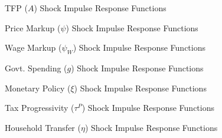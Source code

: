 \begin{figure}[ht]
    \centering
    \caption{TFP ($A$) Shock Impulse Response Functions}
    
    \label{fig:A-agg-irf}
\end{figure}

\begin{figure}[ht]
    \centering
    \caption{Price Markup ($\psi$) Shock Impulse Response Functions}
    
    \label{fig:psi-agg-irf}
\end{figure}

\begin{figure}[ht]
    \centering
    \caption{Wage Markup ($\psi_W$) Shock Impulse Response Functions}
    
    \label{fig:psiW-agg-irf}
\end{figure}

\begin{figure}[ht]
    \centering
    \caption{Govt. Spending ($g$) Shock Impulse Response Functions}
    
    \label{fig:g-agg-irf}
\end{figure}

\begin{figure}[ht]
    \centering
    \caption{Monetary Policy ($\xi$) Shock Impulse Response Functions}
    
    \label{fig:xi-agg-irf}
\end{figure}

\begin{figure}[ht]
    \centering
    \caption{Tax Progressivity ($\tau^P$) Shock Impulse Response Functions}
    
    \label{fig:tauP-agg-irf}
\end{figure}

\begin{figure}[ht]
    \centering
    \caption{Household Transfer ($\eta$) Shock Impulse Response Functions}
    
    \label{fig:eta-agg-irf}
\end{figure}
